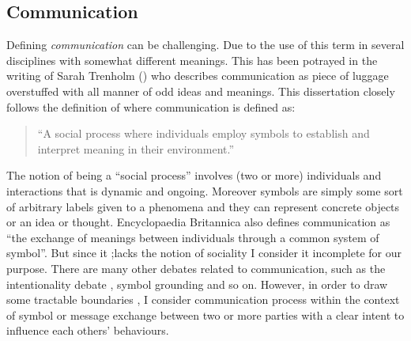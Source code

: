 \subsection{Communication} 
Defining {\em communication} can be challenging. Due to the use of this term in several disciplines with somewhat different meanings. This has been potrayed in the writing of Sarah Trenholm (\cite{West+2003}) who describes communication as piece of luggage overstuffed with all manner of odd ideas and meanings. This dissertation closely follows the definition of \cite{West+2003} where communication is defined as:
\begin{quotation}
``A social process where individuals employ symbols to establish and interpret meaning in their environment.''
\end{quotation}
The notion of being a ``social process'' involves (two or more) individuals and interactions that is dynamic and ongoing. Moreover symbols are simply some sort of arbitrary labels given to a phenomena and they can represent  concrete objects or an idea or thought. Encyclopaedia Britannica also defines communication as ``the exchange of meanings between individuals through a common system of symbol''. But since it ;lacks the notion of sociality I consider it incomplete for our purpose. There are many other debates related to communication, such as  the intentionality debate \cite{West+2003}, symbol grounding and so on. However, in order to draw some tractable boundaries , I consider communication process within the context of  symbol or message exchange between two or more parties with a clear intent  to influence each others' behaviours.


